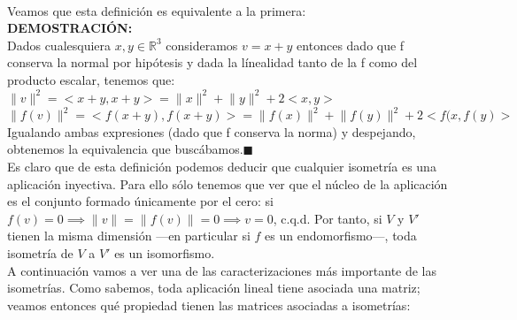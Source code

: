 \documentclass[10pt,a4paper]{article}
\theoremstyle{mystyle}
\newtheorem{defi}{\textcolor{red}{\textbf{Definición}}}
\newtheorem{teo}{\textcolor{blue}{\textbf{Teorema}}}
\begin{document}
\hfill \\

Veamos que esta definición es equivalente a la primera:\\

\textbf{DEMOSTRACIÓN:}\\

Dados cualesquiera $x, y \in \mathbb{R}^3$ consideramos $v = x+y$ entonces dado que f conserva la normal por hipótesis y dada la línealidad tanto de la f como del producto escalar, tenemos que:\\

$\lVert v \rVert^{2} = <x+y,x+y> = \lVert x \rVert^{2} + \lVert y \rVert^{2} + 2<x,y>$\\
$\lVert f(v) \rVert^{2} = <f(x+y),f(x+y)> = \lVert f(x) \rVert^{2} + \lVert f(y) \rVert^{2} + 2<f(x,f(y)>$\\

Igualando ambas expresiones (dado que f conserva la norma) y despejando, obtenemos la equivalencia que buscábamos.$\blacksquare$\\


Es claro que de esta definición podemos deducir que cualquier isometría es una aplicación inyectiva. Para ello sólo tenemos que ver que el núcleo de la aplicación es el conjunto formado únicamente por el cero: si $f(v) = 0 \implies \lVert v \rVert= \lVert f(v) \rVert = 0 \implies v = 0$, c.q.d. Por tanto, si $V$ y $V'$ tienen la misma dimensión ---en particular si $f$ es un endomorfismo---, toda isometría de $V$ a $V'$ es un isomorfismo.\\

A continuación vamos a ver una de las caracterizaciones más importante de las isometrías. Como sabemos, toda aplicación lineal tiene asociada una matriz; veamos entonces qué propiedad tienen las matrices asociadas a isometrías:\\

\hfill \\
\end{document}
